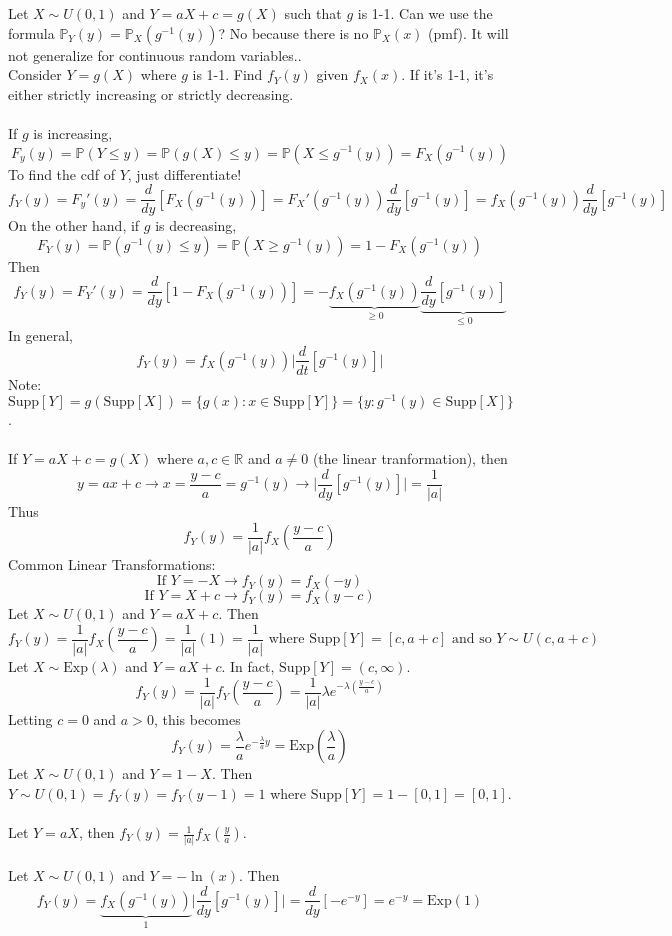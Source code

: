 \documentclass[12pt]{article}
\newcommand{\prob}[1]{\mathbb{P}(#1)}
\newcommand{\probsub}[2]{\mathbb{P}_{#1}(#2)}
\newcommand{\supp}[1]{\text{Supp}[ #1 ]}
\newcommand{\ginvy}{g^{-1}(y)}
\begin{document}
Let $X \sim U(0, 1)$ and $Y = aX + c = g(X)$ such that $g$ is 1-1. Can we use the formula $\probsub{Y}{y} = \probsub{X}{\ginvy}$? No because there is no $\probsub{X}{x}$ (pmf). It will not generalize for continuous random variables.. \\ Consider $Y = g(X)$ where $g$ is 1-1. Find $f_Y(y)$ given $f_X(x)$. If it's 1-1, it's either strictly increasing or strictly decreasing. \\~\\
If $g$ is increasing, $$F_y(y) = \prob{Y \leq y} = \prob{g(X) \leq y} = \prob{X \leq \ginvy} = F_X(\ginvy)$$ To find the cdf of $Y$, just differentiate! $$f_Y(y) = F_y'(y) = \frac{d}{dy} [F_X(\ginvy)] = F_X'(\ginvy)\frac{d}{dy}[\ginvy] = f_X(\ginvy)\frac{d}{dy}[\ginvy]$$ 
On the other hand, if $g$ is decreasing, $$F_Y(y) = \prob{\ginvy \leq y} = \prob{X \geq \ginvy} = 1 - F_X(\ginvy)$$ Then $$f_Y(y) = F_Y'(y) = \frac{d}{dy}[1 - F_X(\ginvy)] = -\underbrace{f_X(\ginvy)}_{\geq 0} \underbrace{\frac{d}{dy}[\ginvy]}_{\leq 0} $$ 
In general, $$f_Y(y) = f_X(\ginvy)\Big| \frac{d}{dt} [\ginvy]\Big|$$ Note: $\supp{Y} = g(\supp{X}) = \{g(x) : x \in \supp{Y}\} = \{y: \ginvy \in \supp{X}\} $. \\~\\
If $Y = aX + c = g(X)$ where $a, c \in \mathbb{R}$ and $a \neq 0$ (the linear tranformation), then
$$y = ax + c \to x = \frac{y - c}{a} = \ginvy \to \Big| \frac{d}{dy}[\ginvy]\Big| = \frac{1}{|a|} $$ Thus 
$$f_Y(y) = \frac{1}{|a|}f_X(\frac{y - c}{a})$$ Common Linear Transformations: $$ \text{If } Y = -X \to f_Y(y) = f_X(-y) $$ $$\text{If } Y = X + c \to f_Y(y) = f_X(y - c) $$ 
Let $X \sim U(0, 1)$ and $Y = aX + c$. Then $$f_Y(y) = \frac{1}{|a|}f_X(\frac{y - c}{a}) = \frac{1}{|a|}(1) = \frac{1}{|a|} \text{ where } \supp{Y} = [c, a + c] \text{ and so } Y \sim U(c, a + c) $$ 
Let $X \sim \text{Exp}(\lambda)$ and $Y = aX + c$. In fact, $\supp{Y} = (c, \infty)$. 
$$f_Y(y) = \frac{1}{|a|} f_Y(\frac{y - c}{a}) = \frac{1}{|a|} \lambda e^{-\lambda( \frac{y - c}{a} )} $$ 
Letting $c = 0$ and $a > 0$, this becomes $$f_Y(y) = \frac{\lambda}{a} e^{-\frac{\lambda}{a}y} = \text{Exp}(\frac{\lambda}{a}) $$ 
Let $X \sim U(0, 1)$ and $Y = 1 - X$. Then $Y \sim U(0, 1) = f_Y(y) = f_Y(y - 1) = 1$ where $\supp{Y} = 1 - [0, 1] = [0, 1]$. \\~\\
Let $Y = aX$, then  $f_Y(y) = \frac{1}{|a|}f_X(\frac{y}{a})$. \\~\\
Let $X \sim U(0 ,1)$ and $Y = -\ln(x)$. Then $$f_Y(y) = \underbrace{f_X(\ginvy)}_1\Big| \frac{d}{dy} [\ginvy]\Big| = \frac{d}{dy} [-e^{-y}] = e^{-y} = \text{Exp}(1)$$ 
\end{document}
